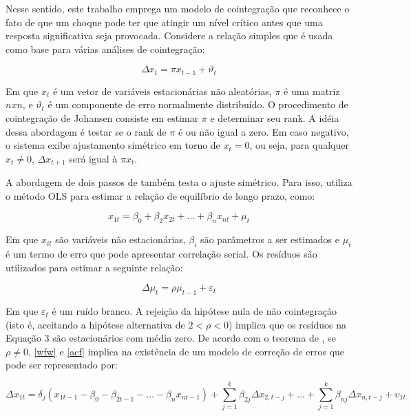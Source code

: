 \documentclass[
	article,			%
	12pt,				%
	openright,			%
	oneside,			%
	a4paper,			%
	english,			%
	brazil				%
	]{abntex2}
\begin{document}
Nesse sentido, este trabalho emprega um modelo de cointegração que reconhece o fato de que um choque pode ter que atingir um nível crítico antes que uma resposta significativa seja provocada. Considere a relação simples que é usada como base para várias análises de cointegração:

\begin{equation}
\Delta x_{t}=\pi x_{t-1} + \vartheta_{t}
\end{equation}

Em que $x_{t}$ é um vetor de variáveis estacionárias não aleatórias, $\pi$ é uma matriz $n x n$, e $\vartheta_{t}$ é um componente de erro normalmente distribuído. O procedimento de cointegração de Johansen consiste em estimar $\pi$ e determinar seu rank. A idéia dessa abordagem é testar se o rank de $\pi$ é ou não igual a zero. Em caso negativo, o sistema exibe ajustamento simétrico em torno de $x_{t}=0$, ou seja, para qualquer $x_{t}\neq 0$, $\Delta x_{t+1}$ será igual à $\pi x_{t}$.


A abordagem de dois passos de  também testa o ajuste simétrico. Para isso, utiliza o método OLS para estimar a relação de equilíbrio de longo prazo, como:

\begin{equation} \label{wfw}
x_{1t}=\beta_{0}+\beta_{2}x_{2t}+...+\beta_{n}x_{nt}+\mu_{t}
\end{equation}

Em que $x_{it}$ são variáveis não estacionárias, $\beta_{i}$ são parâmetros a ser estimados e $\mu_{t}$ é um termo de erro que pode apresentar correlação serial. Os resíduos são utilizados para estimar a seguinte relação:

\begin{equation} \label{acf}
\Delta \mu_{t}=\rho \mu_{t-1}+\varepsilon_{t}
\end{equation}

Em que $\varepsilon_{t}$ é um ruído branco. A rejeição da hipótese nula de não cointegração (isto é, aceitando a hipótese alternativa de $2<\rho <0$) implica que os resíduos na Equação 3 são estacionários com média zero. De acordo com o teorema de , se $\rho \neq 0$, \ref{wfw} e \ref{acf} implica na existência de um modelo de correção de erros que pode ser representado por:

\begin{equation} \label{deo}
\Delta x_{1t}=\delta_{j}\left ( x_{1t-1}-\beta_{0}-\beta_{2t-1}-...-\beta_{n}x_{nt-1} \right ) + \sum_{j=1}^{k}\beta_{2j}\Delta x_{2,t-j}+...+\sum_{j=1}^{k}\beta_{nj}\Delta x_{n,t-j}+\upsilon_{1t}
\end{equation}
\end{document}
